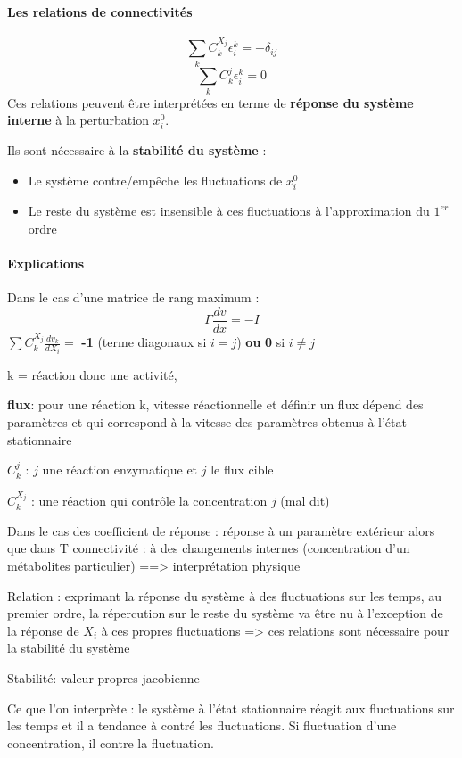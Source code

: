 \paragraph{Les relations de connectivités}
$$ \sum_k C_k^{X_j} \epsilon _i^k  =  - \delta_{ij} $$
$$ \sum_k C_k^j \epsilon_i^k  =  0 $$
Ces relations peuvent être interprétées en terme de \textbf{réponse du système interne} à la perturbation $x_i^0$.

Ils sont nécessaire à la \textbf{stabilité du système} :
\begin{itemize}
	\item Le système contre/empêche les fluctuations de $x_i^0$
	\item Le reste du système est insensible à ces fluctuations à l'approximation du $1^{er}$ ordre
\end{itemize}





\paragraph{Explications}
Dans le cas d'une matrice de rang maximum :
$$ \Gamma \frac{dv}{dx}= -I $$
$ \sum C_k^{X_j}\frac{dv_k}{dX_i}= $	\textbf{-1} (terme diagonaux si $i=j$) \textbf{ou} 	\textbf{0} si $i \neq j$

k = réaction donc une activité, 

\textbf{flux}: pour une réaction k, vitesse réactionnelle et définir un flux dépend des paramètres et qui correspond à la vitesse des paramètres obtenus à l'état stationnaire

$C_k^j$ : $j$ une réaction enzymatique et $j$ le flux cible

$C_k^{X_j}$ : une réaction qui contrôle la concentration $j$ (mal dit)

Dans le cas des coefficient de réponse : réponse à un paramètre extérieur alors que dans T connectivité :  à des changements internes (concentration d'un métabolites particulier)
==> interprétation physique

Relation : exprimant la réponse du système à des fluctuations sur les temps, au premier ordre, la répercution sur le reste du système va être nu à l'exception de la réponse de $X_i$ à ces propres fluctuations => ces relations sont nécessaire pour la stabilité du système

Stabilité: valeur propres jacobienne

Ce que l'on interprète : le système à l'état stationnaire réagit aux fluctuations sur les temps et il a tendance à contré les fluctuations. Si fluctuation d'une concentration, il contre la fluctuation. 




